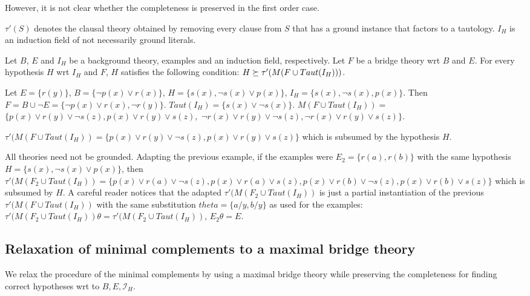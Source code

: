 However, it is not clear whether the completeness is preserved in the first order case.

$\tau'(S)$ denotes the clausal theory obtained by removing every clause from $S$ that has a ground instance that factors to a tautology. $I_H$ is an induction field of not necessarily ground literals.

\begin{conjecture}\label{subsumptionConjectureFirstOrder}
Let $B$, $E$ and $I_H$ be a background theory, examples and an induction field, respectively. Let $F$ be a bridge theory wrt $B$ and $E$. For every hypothesis $H$ wrt $I_H$ and $F$, $H$ satisfies the following condition:
$H \succeq \tau'(M(F \cup Taut(I_H)))$.
\end{conjecture}

\begin{exmp}
Let $E=\{r(y)\}$,
$B=\{\neg p(x) \vee r(x)\}$,
$H=\{s(x), \neg s(x) \vee p(x)\}$,
$I_H=\{s(x), \neg s(x), p(x)\}$.
Then $F=B \cup \neg E=\{\neg p(x) \vee r(x), \neg r(y) \}$.
$Taut(I_H)=\{s(x) \vee \neg s(x)\}$.
$M(F \cup Taut(I_H))=$
$\{p(x) \vee r(y) \vee \neg s(z), p(x) \vee r(y) \vee s(z),$
$\neg r(x) \vee r(y) \vee \neg s(z),\neg r(x) \vee r(y) \vee s(z) \}$.

$\tau'(M(F \cup Taut(I_H))=\{p(x) \vee r(y) \vee \neg s(z), p(x) \vee r(y) \vee s(z)\}$ which is subsumed by the hypothesis $H$.
\end{exmp}

\begin{exmp}
All theories need not be grounded. Adapting the previous example, if the examples were
$E_2=\{r(a), r(b)\}$ with the same hypothesis
$H=\{s(x), \neg s(x) \vee p(x)\}$, then
$\tau'(M(F_2 \cup Taut(I_H))=\{p(x) \vee r(a) \vee \neg s(z), p(x) \vee r(a) \vee s(z), p(x) \vee r(b) \vee \neg s(z), p(x) \vee r(b) \vee s(z) \}$ which is subsumed by $H$. A careful reader notices that the adapted $\tau'(M(F_2 \cup Taut(I_H))$ is just a partial instantiation of the previous
$\tau'(M(F \cup Taut(I_H))$ with the same substitution
$theta=\{a / y, b / y\}$ as used for the examples:
$\tau'(M(F_2 \cup Taut(I_H)) \theta=\tau'(M(F_2 \cup Taut(I_H))$,
$E_2 \theta = E$.
\end{exmp}

\subsection{Relaxation of minimal complements to a maximal bridge theory}
We relax the procedure of the minimal complements by using a maximal bridge theory while preserving the completeness for finding correct hypotheses wrt to $B, E, \mathcal{I}_H$.

